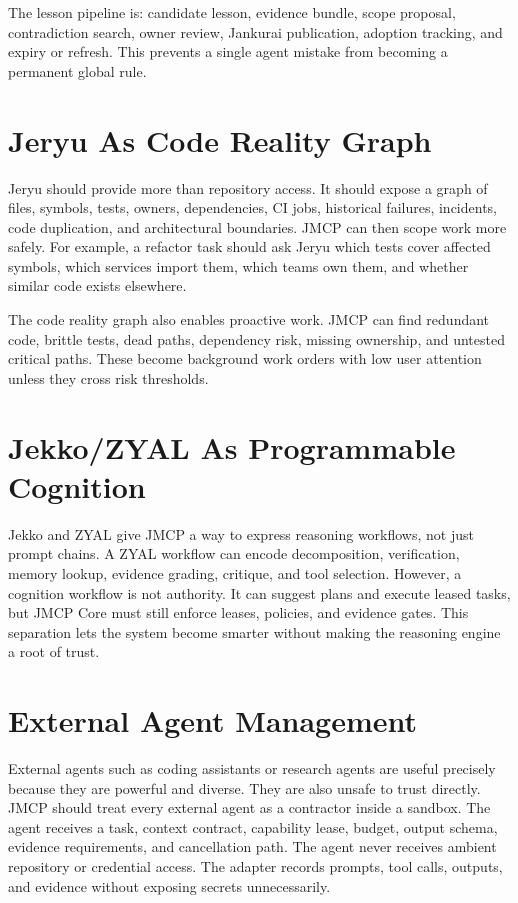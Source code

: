 \documentclass[10pt,journal,onecolumn]{IEEEtran}
\begin{document}
The lesson pipeline is: candidate lesson, evidence bundle, scope proposal, contradiction search, owner review, Jankurai publication, adoption tracking, and expiry or refresh. This prevents a single agent mistake from becoming a permanent global rule.

\section{Jeryu As Code Reality Graph}
Jeryu should provide more than repository access. It should expose a graph of files, symbols, tests, owners, dependencies, CI jobs, historical failures, incidents, code duplication, and architectural boundaries. JMCP can then scope work more safely. For example, a refactor task should ask Jeryu which tests cover affected symbols, which services import them, which teams own them, and whether similar code exists elsewhere.

The code reality graph also enables proactive work. JMCP can find redundant code, brittle tests, dead paths, dependency risk, missing ownership, and untested critical paths. These become background work orders with low user attention unless they cross risk thresholds.

\section{Jekko/ZYAL As Programmable Cognition}
Jekko and ZYAL give JMCP a way to express reasoning workflows, not just prompt chains. A ZYAL workflow can encode decomposition, verification, memory lookup, evidence grading, critique, and tool selection. However, a cognition workflow is not authority. It can suggest plans and execute leased tasks, but JMCP Core must still enforce leases, policies, and evidence gates. This separation lets the system become smarter without making the reasoning engine a root of trust.

\section{External Agent Management}
External agents such as coding assistants or research agents are useful precisely because they are powerful and diverse. They are also unsafe to trust directly. JMCP should treat every external agent as a contractor inside a sandbox. The agent receives a task, context contract, capability lease, budget, output schema, evidence requirements, and cancellation path. The agent never receives ambient repository or credential access. The adapter records prompts, tool calls, outputs, and evidence without exposing secrets unnecessarily.
\end{document}

